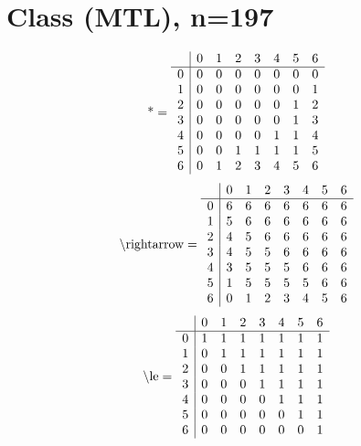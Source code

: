 \documentclass[11pt]{article}
\begin{document}
\section{Class (MTL), n=197}
\[\text{*} = 
\begin{array}{r | r r r r r r r}
 & 0 & 1 & 2 & 3 & 4 & 5 & 6 \\ \hline
0 & 0 & 0 & 0 & 0 & 0 & 0 & 0 \\
1 & 0 & 0 & 0 & 0 & 0 & 0 & 1 \\
2 & 0 & 0 & 0 & 0 & 0 & 1 & 2 \\
3 & 0 & 0 & 0 & 0 & 0 & 1 & 3 \\
4 & 0 & 0 & 0 & 0 & 1 & 1 & 4 \\
5 & 0 & 0 & 1 & 1 & 1 & 1 & 5 \\
6 & 0 & 1 & 2 & 3 & 4 & 5 & 6 \\
\end{array}
\]
\[\text{\textbackslash rightarrow} = 
\begin{array}{r | r r r r r r r}
 & 0 & 1 & 2 & 3 & 4 & 5 & 6 \\ \hline
0 & 6 & 6 & 6 & 6 & 6 & 6 & 6 \\
1 & 5 & 6 & 6 & 6 & 6 & 6 & 6 \\
2 & 4 & 5 & 6 & 6 & 6 & 6 & 6 \\
3 & 4 & 5 & 5 & 6 & 6 & 6 & 6 \\
4 & 3 & 5 & 5 & 5 & 6 & 6 & 6 \\
5 & 1 & 5 & 5 & 5 & 5 & 6 & 6 \\
6 & 0 & 1 & 2 & 3 & 4 & 5 & 6 \\
\end{array}
\]
\[\text{\textbackslash le} = 
\begin{array}{r | r r r r r r r}
 & 0 & 1 & 2 & 3 & 4 & 5 & 6 \\ \hline
0 & 1 & 1 & 1 & 1 & 1 & 1 & 1 \\
1 & 0 & 1 & 1 & 1 & 1 & 1 & 1 \\
2 & 0 & 0 & 1 & 1 & 1 & 1 & 1 \\
3 & 0 & 0 & 0 & 1 & 1 & 1 & 1 \\
4 & 0 & 0 & 0 & 0 & 1 & 1 & 1 \\
5 & 0 & 0 & 0 & 0 & 0 & 1 & 1 \\
6 & 0 & 0 & 0 & 0 & 0 & 0 & 1 \\
\end{array}
\]
\end{document}
